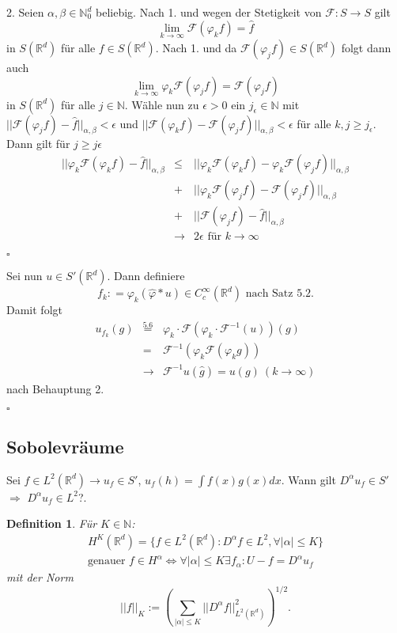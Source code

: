 \documentclass[12pt,a4paper,titlepage]{scrartcl}
\newtheorem{Definition}[Satz]{Definition}
\numberwithin{equation}{section}
\newcommand{\R}{\mathbb{R}} %
\newcommand{\N}{\mathbb{N}} %
\newcommand{\f}{\hat{f}}
\newcommand{\g}{\hat{g}}
\newcommand{\F}{\mathcal{F}}
\newcommand{\m}{\cdot}
\newcommand{\qed}{\begin{flushright}
		$\square$
	\end{flushright}}
\begin{document}
	2. Seien $\alpha,\beta\in \N_0^d$ beliebig. Nach 1. und wegen der Stetigkeit von $\F: S\rightarrow S$ gilt
	$$\lim\limits_{k\rightarrow\infty}\F(\varphi_k f) = \f$$ 
	in $S(\R^d)$ für alle $f\in S(\R^d)$. Nach 1. und da $\F(\varphi_j f)\in S(\R^d)$ folgt dann auch 
	$$\lim\limits_{k\rightarrow\infty}\varphi_k \F(\varphi_j f) = \F(\varphi_j f)$$
	in $S(\R^d)$ für alle $j\in \N$. Wähle nun zu $\epsilon>0$ ein $j_\epsilon\in \N$ mit $||\F(\varphi_j f)-\f||_{\alpha,\beta} <\epsilon$ und $||\F(\varphi_k f)-\F(\varphi_j f)||_{\alpha,\beta}<\epsilon$ für alle $k,j\geq j_\epsilon$. Dann gilt für $j\geq j\epsilon$
	\begin{eqnarray}
		||\varphi_k\F(\varphi_k f)-\f||_{\alpha,\beta}&\leq & ||\varphi_k\F(\varphi_k f) - \varphi_k\F(\varphi_j f)||_{\alpha,\beta}\nonumber\\
		&+& ||\varphi_k\F(\varphi_j f) - \F(\varphi_j f)||_{\alpha,\beta}\nonumber\\
		&+& ||\F(\varphi_j f) - \f||_{\alpha,\beta}\nonumber\\
		&\rightarrow& 2\epsilon \text{ für } k\rightarrow\infty\nonumber
	\end{eqnarray} %
	\qed
	
	Sei nun $u\in S'(\R^d)$. Dann definiere 
	$$f_k: = \varphi_k(\hat{\varphi}* u)\in C_c^\infty(\R^d) \text{ nach Satz 5.2}.$$
	Damit folgt 
	\begin{eqnarray}
		u_{f_k}(g) &\overset{\text{5.6}}{=}& \varphi_k\m\F(\varphi_k\m\F^{-1}(u))(g) \nonumber\\
		&=& \F^{-1}(\varphi_k\F(\varphi_k g))\nonumber\\
		&\rightarrow& \F^{-1}u(\g) = u(g)~(k\rightarrow\infty)\nonumber
	\end{eqnarray}
	nach Behauptung 2.
	\qed

	\newpage
	
	\subsection{Sobolevräume}
	
	Sei $f\in L^2(\R^d)\rightarrow u_f\in S'$, $u_f(h) =\int f(x)g(x) dx$. Wann gilt $D^\alpha u_f\in S'$ $\Rightarrow$ $D^\alpha u_f \in L^2$?.
	
	\begin{Definition}
		Für $K\in \N$: 
		\begin{eqnarray}
			H^K(\R^d) =\{f\in L^2(\R^d): D^\alpha f\in L^2, \forall |\alpha|\leq K \}\nonumber\\
			\text{genauer } f\in H^\alpha\Leftrightarrow \forall|\alpha|\leq K\exists f_\alpha: U-f=D^\alpha u_f\nonumber
		\end{eqnarray}
		mit der Norm
		$$||f||_K:= \left(\sum_{|\alpha|\leq K}||D^\alpha f||_{L^2(\R^d)}^2 \right)^{1/2}.$$
	\end{Definition}
	
\end{document}
